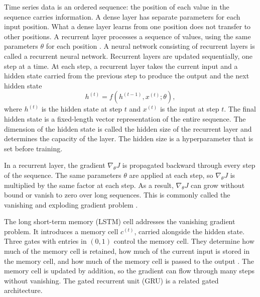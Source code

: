 Time series data is an ordered sequence: the position of each value in the sequence carries information. A dense layer has separate parameters for each input position. What a dense layer learns from one position does not transfer to other positions. A recurrent layer processes a sequence of values, using the same parameters $\theta$ for each position \parencite[378--381]{goodfellowDeepLearning2016}. A neural network consisting of recurrent layers is called a recurrent neural network. Recurrent layers are updated sequentially, one step at a time. At each step, a recurrent layer takes the current input and a hidden state carried from the previous step to produce the output and the next hidden state
\begin{equation}
h^{(t)} = f\!\left(h^{(t-1)}, x^{(t)}; \theta\right),
\end{equation}
where $h^{(t)}$ is the hidden state at step $t$ and $x^{(t)}$ is the input at step $t$. The final hidden state is a fixed-length vector representation of the entire sequence. The dimension of the hidden state is called the hidden size of the recurrent layer and determines the capacity of the layer. The hidden size is a hyperparameter that is set before training.

In a recurrent layer, the gradient $\nabla_{\theta}J$ is propagated backward through every step of the sequence. The same parameters $\theta$ are applied at each step, so $\nabla_{\theta}J$ is multiplied by the same factor at each step. As a result, $\nabla_{\theta}J$ can grow without bound or vanish to zero over long sequences. This is commonly called the  vanishing and exploding gradient problem \parencite[401--403]{goodfellowDeepLearning2016}.

The long short-term memory (LSTM) cell \parencite{hochreiterLongShortTermMemory1997} addresses the vanishing gradient problem. It introduces a memory cell $c^{(t)}$, carried alongside the hidden state. Three gates with entries in $(0, 1)$ control the memory cell. They determine how much of the memory cell is retained, how much of the current input is stored in the memory cell, and how much of the memory cell is passed to the output \parencite[408--411]{goodfellowDeepLearning2016}. The memory cell is updated by addition, so the gradient can flow through many steps without vanishing. The gated recurrent unit (GRU) \parencite{choLearningPhraseRepresentations2014} is a related gated architecture.